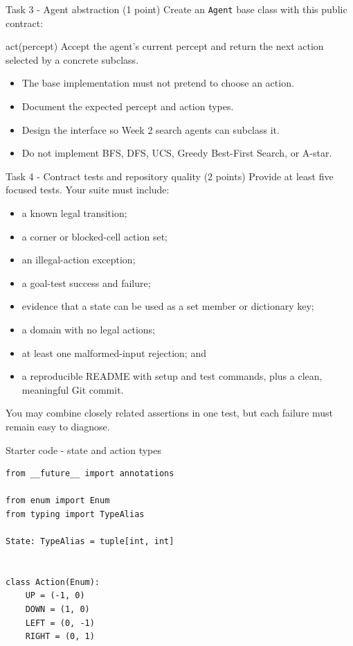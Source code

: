 \documentclass[aspectratio=169,11pt]{beamer}
\begin{document}
\begin{frame}{Task 3 - Agent abstraction (1 point)}
  Create an \texttt{Agent} base class with this public contract:

  \vspace{0.35cm}
  \begin{block}{act(percept)}
    Accept the agent's current percept and return the next action selected by a
    concrete subclass.
  \end{block}

  \begin{itemize}
    \item The base implementation must not pretend to choose an action.
    \item Document the expected percept and action types.
    \item Design the interface so Week 2 search agents can subclass it.
    \item Do not implement BFS, DFS, UCS, Greedy Best-First Search, or A-star.
  \end{itemize}
\end{frame}

\begin{frame}{Task 4 - Contract tests and repository quality (2 points)}
  Provide at least five focused tests. Your suite must include:
  \begin{itemize}
    \item a known legal transition;
    \item a corner or blocked-cell action set;
    \item an illegal-action exception;
    \item a goal-test success and failure;
    \item evidence that a state can be used as a set member or dictionary key;
    \item a domain with no legal actions;
    \item at least one malformed-input rejection; and
    \item a reproducible README with setup and test commands, plus a clean,
      meaningful Git commit.
  \end{itemize}

  \vspace{0.25cm}
  You may combine closely related assertions in one test, but each failure must
  remain easy to diagnose.
\end{frame}

\begin{frame}[fragile]{Starter code - state and action types}
\begin{lstlisting}
from __future__ import annotations

from enum import Enum
from typing import TypeAlias

State: TypeAlias = tuple[int, int]


class Action(Enum):
    UP = (-1, 0)
    DOWN = (1, 0)
    LEFT = (0, -1)
    RIGHT = (0, 1)
\end{lstlisting}
\end{frame}
\end{document}
